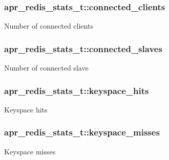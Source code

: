 \subsubsection[{\texorpdfstring{connected\+\_\+clients}{connected_clients}}]{ apr\+\_\+redis\+\_\+stats\+\_\+t\+::connected\+\_\+clients}\hypertarget{structapr__redis__stats__t_a662da35ea55c251ba6b669314d7bb452}{}\label{structapr__redis__stats__t_a662da35ea55c251ba6b669314d7bb452}
Number of connected clients 
\subsubsection[{\texorpdfstring{connected\+\_\+slaves}{connected_slaves}}]{ apr\+\_\+redis\+\_\+stats\+\_\+t\+::connected\+\_\+slaves}\hypertarget{structapr__redis__stats__t_a8727a6f8fa7b6e7464aa50d422ea672d}{}\label{structapr__redis__stats__t_a8727a6f8fa7b6e7464aa50d422ea672d}
Number of connected slave 
\subsubsection[{\texorpdfstring{keyspace\+\_\+hits}{keyspace_hits}}]{ apr\+\_\+redis\+\_\+stats\+\_\+t\+::keyspace\+\_\+hits}\hypertarget{structapr__redis__stats__t_a48afcd24a53bab228576c4e649e989db}{}\label{structapr__redis__stats__t_a48afcd24a53bab228576c4e649e989db}
Keyspace hits 
\subsubsection[{\texorpdfstring{keyspace\+\_\+misses}{keyspace_misses}}]{ apr\+\_\+redis\+\_\+stats\+\_\+t\+::keyspace\+\_\+misses}\hypertarget{structapr__redis__stats__t_ab0928f7503120f1a1db21ec001c8c4ed}{}\label{structapr__redis__stats__t_ab0928f7503120f1a1db21ec001c8c4ed}
Keyspace misses 

